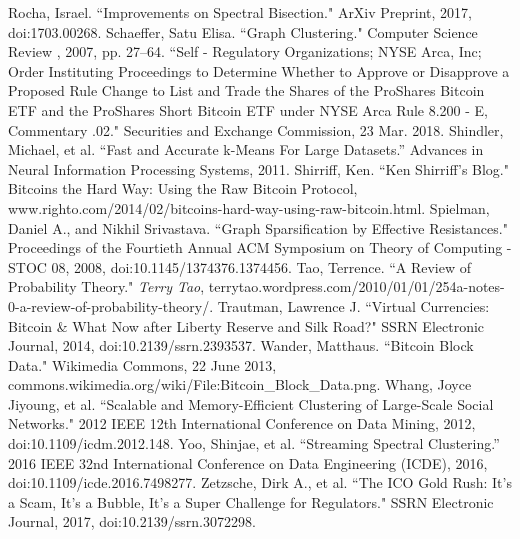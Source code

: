 \documentclass{article}
\begin{document}
\begin{thebibliography}{1}
 Rocha, Israel. ``Improvements on Spectral Bisection." ArXiv Preprint, 2017, doi:1703.00268.
 Schaeffer, Satu Elisa. ``Graph Clustering." Computer Science Review , 2007, pp. 27–64.
 ``Self - Regulatory Organizations; NYSE Arca, Inc; Order Instituting Proceedings to Determine Whether to Approve or Disapprove a Proposed Rule Change to List and Trade the Shares of the ProShares Bitcoin ETF and the ProShares Short Bitcoin ETF under NYSE Arca Rule 8.200 - E, Commentary .02." Securities and Exchange Commission, 23 Mar. 2018.
 Shindler, Michael, et al. ``Fast and Accurate k-Means For Large Datasets.” Advances in Neural Information Processing Systems, 2011. 
 Shirriff, Ken. ``Ken Shirriff's Blog." Bitcoins the Hard Way: Using the Raw Bitcoin Protocol, www.righto.com/2014/02/bitcoins-hard-way-using-raw-bitcoin.html. 
 Spielman, Daniel A., and Nikhil Srivastava. ``Graph Sparsification by Effective Resistances." Proceedings of the Fourtieth Annual ACM Symposium on Theory of Computing - STOC 08, 2008, doi:10.1145/1374376.1374456.
 Tao, Terrence. ``A Review of Probability Theory." \textit{Terry Tao}, terrytao.wordpress.com/2010/01/01/254a-notes-0-a-review-of-probability-theory/.
 Trautman, Lawrence J. ``Virtual Currencies: Bitcoin \& What Now after Liberty Reserve and Silk Road?" SSRN Electronic Journal, 2014, doi:10.2139/ssrn.2393537.
 Wander, Matthaus. ``Bitcoin Block Data." Wikimedia Commons, 22 June 2013, commons.wikimedia.org/wiki/File:Bitcoin\_Block\_Data.png.
 Whang, Joyce Jiyoung, et al. ``Scalable and Memory-Efficient Clustering of Large-Scale Social Networks." 2012 IEEE 12th International Conference on Data Mining, 2012, doi:10.1109/icdm.2012.148.
 Yoo, Shinjae, et al. “Streaming Spectral Clustering.” 2016 IEEE 32nd International Conference on Data Engineering (ICDE), 2016, doi:10.1109/icde.2016.7498277. 
 Zetzsche, Dirk A., et al. ``The ICO Gold Rush: It's a Scam, It's a Bubble, It's a Super Challenge for Regulators." SSRN Electronic Journal, 2017, doi:10.2139/ssrn.3072298.
\end{thebibliography}

\clearpage
\end{document}
